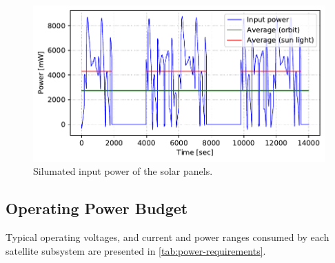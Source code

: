 \begin{figure}[!ht]
    \begin{center}
        \includegraphics[width=\textwidth]{curves/sp_sim_power}
        \caption{Silumated input power of the solar panels.}
        \label{fig:sp_sim_power}
    \end{center}
\end{figure}

\subsection{Operating Power Budget}

Typical operating voltages, and current and power ranges consumed by each satellite subsystem are presented in \autoref{tab:power-requirements}.

